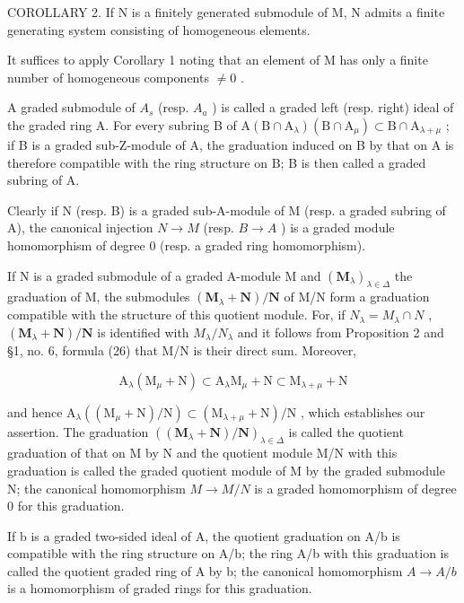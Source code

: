COROLLARY 2. If N is a finitely generated submodule of M, N admits a finite generating system consisting of homogeneous elements.

It suffices to apply Corollary 1 noting that an element of M has only a finite number of homogeneous components \(\neq0\) .

A graded submodule of \(A_{s}\) (resp. \(A_{a}\) ) is called a graded left (resp. right) ideal of the graded ring A. For every subring B of \(\mathrm{A}(\mathrm{B} \cap \mathrm{A}_{\lambda})(\mathrm{B} \cap \mathrm{A}_{\mu}) \subset \mathrm{B} \cap \mathrm{A}_{\lambda + \mu}\) ; if B is a graded sub-Z-module of A, the graduation induced on B by that on A is therefore compatible with the ring structure on B; B is then called a graded subring of A.

Clearly if N (resp. B) is a graded sub-A-module of M (resp. a graded subring of A), the canonical injection \(N \rightarrow M\) (resp. \(B \rightarrow A\) ) is a graded module homomorphism of degree 0 (resp. a graded ring homomorphism).

If N is a graded submodule of a graded A-module M and \((\mathbf{M}_{\lambda})_{\lambda\in\Delta}\) the graduation of M, the submodules \((\mathbf{M}_{\lambda}+\mathbf{N})/\mathbf{N}\) of M/N form a graduation compatible with the structure of this quotient module. For, if \(N_{\lambda}=M_{\lambda}\cap N\) , \((\mathbf{M}_{\lambda}+\mathbf{N})/\mathbf{N}\) is identified with \(M_{\lambda}/N_{\lambda}\) and it follows from Proposition 2 and §1, no. 6, formula (26) that M/N is their direct sum. Moreover,

\[
\mathrm{A} _ {\lambda} (\mathrm{M} _ {\mu} + \mathrm{N}) \subset \mathrm{A} _ {\lambda} \mathrm{M} _ {\mu} + \mathrm{N} \subset \mathrm{M} _ {\lambda + \mu} + \mathrm{N}
\]

and hence \(\mathrm{A}_{\lambda}((\mathrm{M}_{\mu}+\mathrm{N})/\mathrm{N})\subset(\mathrm{M}_{\lambda+\mu}+\mathrm{N})/\mathrm{N}\) , which establishes our assertion. The graduation \(((\mathbf{M}_{\lambda} + \mathbf{N})/\mathbf{N})_{\lambda \in \Delta}\) is called the quotient graduation of that on M by N and the quotient module M/N with this graduation is called the graded quotient module of M by the graded submodule N; the canonical homomorphism \(M \to M/N\) is a graded homomorphism of degree 0 for this graduation.

If b is a graded two-sided ideal of A, the quotient graduation on A/b is compatible with the ring structure on A/b; the ring A/b with this graduation is called the quotient graded ring of A by b; the canonical homomorphism \(A \rightarrow A/b\) is a homomorphism of graded rings for this graduation.

